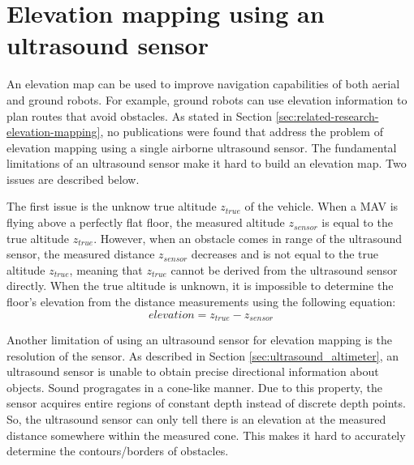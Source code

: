 	\section{Elevation mapping using an ultrasound sensor}
	\label{sec:elevation_map}
An elevation map can be used to improve navigation capabilities of both aerial and ground robots.
For example, ground robots can use elevation information to plan routes that avoid obstacles.
As stated in Section \ref{sec:related-research-elevation-mapping}, no publications were found that address the problem of elevation mapping using a single airborne ultrasound sensor.
The fundamental limitations of an ultrasound sensor make it hard to build an elevation map.
Two issues are described below.

The first issue is the unknow true altitude $z_{true}$ of the vehicle.
When a MAV is flying above a perfectly flat floor, the measured altitude $z_{sensor}$ is equal to the true altitude $z_{true}$.
However, when an obstacle comes in range of the ultrasound sensor, the measured distance $z_{sensor}$ decreases and is not equal to the true altitude $z_{true}$, meaning that $z_{true}$ cannot be derived from the ultrasound sensor directly.
When the true altitude is unknown, it is impossible to determine the floor's elevation from the distance measurements using the following equation:
\begin{equation}
elevation = z_{true} - z_{sensor}
\end{equation}

Another limitation of using an ultrasound sensor for elevation mapping is the resolution of the sensor.
As described in Section \ref{sec:ultrasound_altimeter}, an ultrasound sensor is unable to obtain precise directional information about objects.
Sound progragates in a cone-like manner.
Due to this property, the sensor acquires entire regions of constant depth instead of discrete depth points.
So, the ultrasound sensor can only tell there is an elevation at the measured distance somewhere within the measured cone.
This makes it hard to accurately determine the contours/borders of obstacles.

